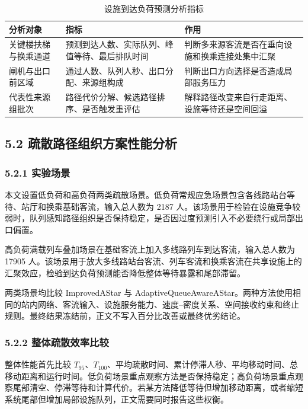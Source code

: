 \documentclass[UTF8,a4paper,12pt]{ctexart}
\begin{document}
\begin{table}[htbp]
\centering
\caption{设施到达负荷预测分析指标}
\small
\begin{tabular}{p{}p{}p{}}
\toprule
分析对象 & 指标 & 作用 \\
\midrule
关键楼扶梯与换乘通道 & 预测到达人数、实际队列、峰值等待、最后排队时间 & 判断多来源客流是否在垂向设施和换乘连接处集中汇聚 \\
闸机与出口前区域 & 通过人数、队列人秒、出口分配、来源组构成 & 判断出口方向选择是否造成局部服务压力 \\
代表性来源组批次 & 路径代价分解、候选路径排序、是否触发重评估 & 解释路径改变来自行走距离、设施等待还是空间回溢 \\
\bottomrule
\end{tabular}
\end{table}

\subsection{5.2 疏散路径组织方案性能分析}

\subsubsection{5.2.1 实验场景}

本文设置低负荷和高负荷两类疏散场景。低负荷常规应急场景包含各线路站台等待、站厅和换乘基础客流，输入总人数为 2187 人。该场景用于检验在设施竞争较弱时，队列感知路径组织是否保持稳定，是否因过度预测引入不必要绕行或局部出口偏置。

高负荷满载列车叠加场景在基础客流上加入多线路列车到达客流，输入总人数为 17905 人。该场景用于放大多线路站台客流、列车客流和换乘客流在共享设施上的汇聚效应，检验到达负荷预测能否降低整体等待暴露和尾部滞留。

两类场景均比较 ImprovedAStar 与 AdaptiveQueueAwareAStar。两种方法使用相同的站内网络、客流输入、设施服务能力、速度--密度关系、空间接收约束和终止规则。最终结果冻结前，正文不写入百分比改善或最终优劣结论。

\subsubsection{5.2.2 整体疏散效率比较}

整体性能首先比较 \(T_{95}\)、\(T_{100}\)、平均疏散时间、累计停滞人秒、平均移动时间、总移动距离和运行时间。低负荷场景重点观察方法是否保持稳定；高负荷场景重点观察尾部清空、停滞等待和计算代价。若某方法降低等待但增加移动距离，或者缩短系统尾部但增加局部设施队列，正文需要同时报告这些权衡。
\end{document}
